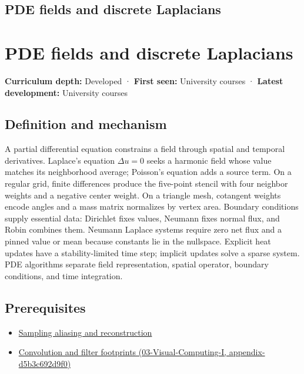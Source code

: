 \hypertarget{appendix-1988d465c119}{}
\section*{PDE fields and discrete Laplacians}
\chapter{PDE fields and discrete Laplacians}\label{appendix-1988d465c119-pde-fields-and-discrete-laplacians}

\textbf{Curriculum depth:} Developed · \textbf{First seen:} University courses · \textbf{Latest development:} University courses

\section{Definition and mechanism}\label{appendix-1988d465c119-definition-and-mechanism}

A partial differential equation constrains a field through spatial and temporal derivatives. Laplace's equation \(\Delta u=0\) seeks a harmonic field whose value matches its neighborhood average; Poisson's equation adds a source term. On a regular grid, finite differences produce the five-point stencil with four neighbor weights and a negative center weight. On a triangle mesh, cotangent weights encode angles and a mass matrix normalizes by vertex area. Boundary conditions supply essential data: Dirichlet fixes values, Neumann fixes normal flux, and Robin combines them. Neumann Laplace systems require zero net flux and a pinned value or mean because constants lie in the nullspace. Explicit heat updates have a stability-limited time step; implicit updates solve a sparse system. PDE algorithms separate field representation, spatial operator, boundary conditions, and time integration.

\section{Prerequisites}\label{appendix-1988d465c119-prerequisites}

\begin{itemize}
\tightlist
\item
  \hyperref[appendix-6a7869dd79a6]{Sampling aliasing and reconstruction}
\item
  \href{../03-Visual-Computing-I/main.pdf\#nameddest=appendix-d5b3c692d9f0}{Convolution and filter footprints (03-Visual-Computing-I, appendix-d5b3c692d9f0)}
\end{itemize}

